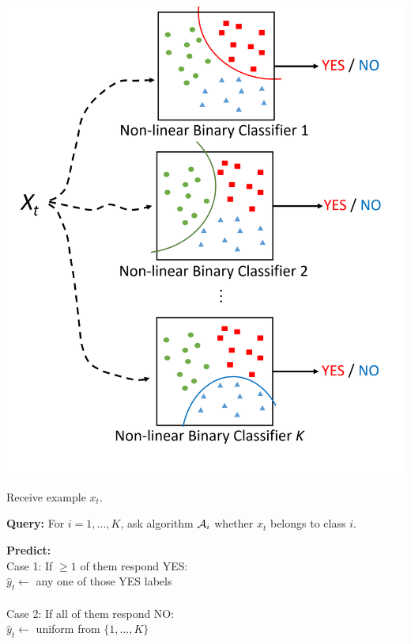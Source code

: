 \documentclass[landscape,a0a,final]{a0poster}
\begin{document}
\begin{multicols}{3}
\begin{minipage}{0.38\linewidth}
    \includegraphics[width=\textwidth]{figures/algorithm.png}
\end{minipage}
\hfill
\begin{minipage}{0.58\linewidth}
    {
    Receive example $x_t$.
    \begin{framed}
    \textbf{Query:} For $i = 1,\ldots,K$, ask algorithm $\mathcal{A}_i$ whether $x_t$ belongs to class $i$.
    \end{framed}
    \begin{framed}
    \textbf{Predict:}\\
    {\color{red} Case 1}: If $\geq 1$ of them respond {\color{red} YES}:\\
    $\widehat{y}_t\leftarrow$ any one of those {\color{red}YES} labels\\
    \\
    {\color{blue} Case 2}: If all of them respond {\color{blue} NO}:\\
    $\widehat{y}_t\leftarrow$ uniform from $\{1,\ldots, K\}$
    \end{framed}
}
\end{minipage}
\end{multicols}
\end{document}
